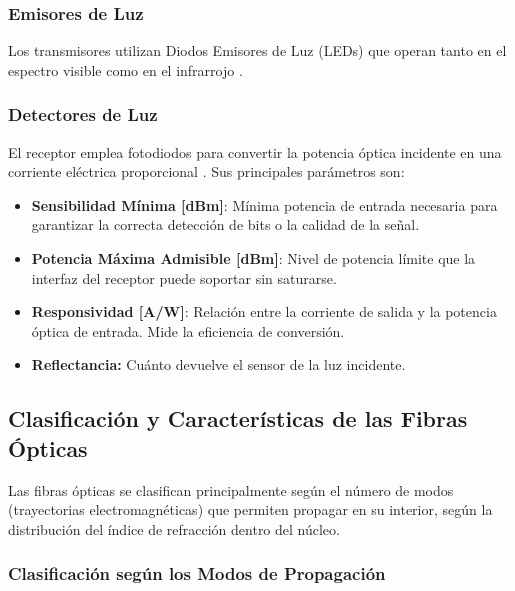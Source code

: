 \subsubsection{Emisores de Luz}
Los transmisores utilizan Diodos Emisores de Luz (LEDs) que operan tanto en el espectro visible como en el infrarrojo \cite{pres3}.

\subsubsection{Detectores de Luz}
El receptor emplea fotodiodos para convertir la potencia óptica incidente en una corriente eléctrica proporcional \cite{pres3}. Sus principales parámetros son:

\begin{itemize}
    \item \textbf{Sensibilidad Mínima [dBm]}: Mínima potencia de entrada necesaria para garantizar la correcta detección de bits o la calidad de la señal.
    
    \item \textbf{Potencia Máxima Admisible [dBm]}: Nivel de potencia límite que la interfaz del receptor puede soportar sin saturarse.
    
    \item \textbf{Responsividad [A/W]}: Relación entre la corriente de salida y la potencia óptica de entrada. Mide la eficiencia de conversión.
    
    \item \textbf{Reflectancia:} Cuánto devuelve el sensor de la luz incidente.
\end{itemize}


\subsection{Clasificación y Características de las Fibras Ópticas}

Las fibras ópticas se clasifican principalmente según el número de modos (trayectorias electromagnéticas) que permiten propagar en su interior, según la distribución del índice de refracción dentro del núcleo.

\subsubsection{Clasificación según los Modos de Propagación}

